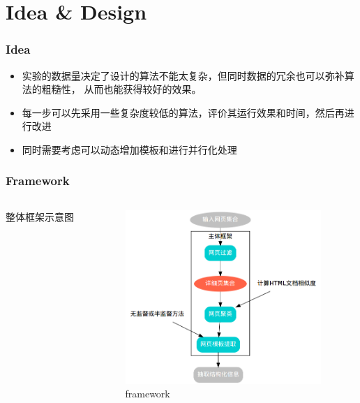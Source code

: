 \documentclass[11pt,presentation]{beamer}
\begin{document}
\section{Idea \& Design}
\label{sec-2}
\begin{frame}
\frametitle{Idea}
\label{sec-2-1}

\begin{itemize}
\item 实验的数据量决定了设计的算法不能太复杂，但同时数据的冗余也可以弥补算法的粗糙性，
  从而也能获得较好的效果。
\item 每一步可以先采用一些复杂度较低的算法，评价其运行效果和时间，然后再进行改进
\item 同时需要考虑可以动态增加模板和进行并行化处理
\end{itemize}
\end{frame}
\begin{frame}
\frametitle{Framework}
\label{sec-2-2}
\begin{columns}[t]
\begin{column}{0.3\textwidth}
\label{sec-2-2-1}

整体框架示意图
\end{column}
\begin{column}{0.7\textwidth}
\label{sec-2-2-2}

    \begin{figure}[htb]
    \centering
    \includegraphics[width=20em,angle=0]{./framework.png}
    \caption{\label{fig:1}framework}
    \end{figure}
\end{column}
\end{columns}
\end{frame}
\end{document}
